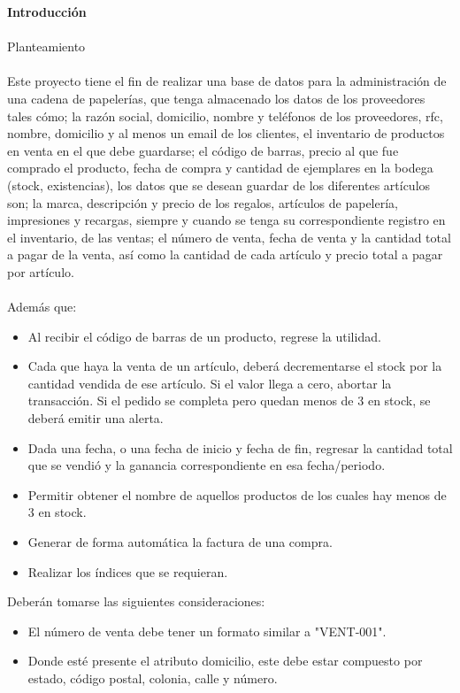 \documentclass[letter,12pt]{article} %
\begin{document}
\newpage
\large{ \textbf{Introducci\'on}}
\\\\
Planteamiento
\\\\
Este proyecto tiene el fin de realizar una base de datos para la administración de una cadena de papelerías, que tenga almacenado los datos de los proveedores tales cómo;  la razón social, domicilio, nombre y teléfonos de los proveedores, rfc, nombre, domicilio y al menos un email de los clientes,  el inventario de productos en venta en el que debe guardarse; el código de barras, precio al que fue comprado el producto, fecha de compra y cantidad de ejemplares en la bodega (stock, existencias), los datos que se desean guardar de los diferentes artículos son; la marca, descripción y precio de los regalos, artículos de papelería, impresiones y
recargas, siempre y cuando se tenga su correspondiente registro en el inventario, de las ventas; el número de venta, fecha de venta y la cantidad total a pagar de la venta, así como la cantidad de cada artículo y precio total a pagar por artículo.
\\\\
Además que:
\begin{itemize}
\item Al recibir el código de barras de un producto, regrese la utilidad.
\item Cada que haya la venta de un artículo, deberá decrementarse el stock por la cantidad vendida de ese artículo. Si el valor llega a cero, abortar la transacción. Si el pedido se completa pero quedan menos de 3 en stock, se deberá emitir una alerta.
\item Dada una fecha, o una fecha de inicio y fecha de fin, regresar la cantidad total que se vendió y la ganancia correspondiente en esa fecha/periodo.
\item Permitir obtener el nombre de aquellos productos de los cuales hay menos de 3 en stock.
\item Generar de forma automática la factura de una compra.
\item Realizar los índices que se requieran.\\
\end{itemize}
Deberán tomarse las siguientes consideraciones:
\begin{itemize}
\item El número de venta debe tener un formato similar a "VENT-001".
\item Donde esté presente el atributo domicilio, este debe estar compuesto por estado, código postal, colonia, calle y número. \newpage
\end{itemize}
\end{document}
